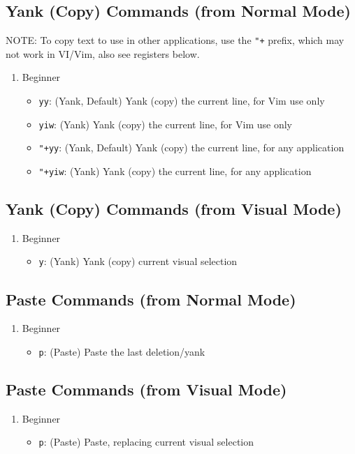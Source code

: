 \documentclass[11pt]{article}
\begin{document}
\subsection{Yank (Copy) Commands (from Normal Mode)}
\label{sec:org9ae1422}
NOTE: To copy text to use in other applications, use the \texttt{"+} prefix, which may
not work in VI/Vim, also see registers below. 
\begin{enumerate}
\item Beginner
\label{sec:org7fb8d96}
\begin{itemize}
\item \texttt{yy}: (Yank, Default) Yank (copy) the current line, for Vim use only
\item \texttt{yiw}: (Yank) Yank (copy) the current line, for Vim use only
\item \texttt{"+yy}: (Yank, Default) Yank (copy) the current line, for any application
\item \texttt{"+yiw}: (Yank) Yank (copy) the current line, for any application
\end{itemize}
\end{enumerate}
\subsection{Yank (Copy) Commands (from Visual Mode)}
\label{sec:orga564125}
\begin{enumerate}
\item Beginner
\label{sec:orgbc5235c}
\begin{itemize}
\item \texttt{y}: (Yank) Yank (copy) current visual selection
\end{itemize}
\end{enumerate}
\subsection{Paste Commands (from Normal Mode)}
\label{sec:org9f45b44}
\begin{enumerate}
\item Beginner
\label{sec:org5f86a11}
\begin{itemize}
\item \texttt{p}: (Paste) Paste the last deletion/yank
\end{itemize}
\end{enumerate}
\subsection{Paste Commands (from Visual Mode)}
\label{sec:orgffb4d8c}
\begin{enumerate}
\item Beginner
\label{sec:orgf25f22d}
\begin{itemize}
\item \texttt{p}: (Paste) Paste, replacing current visual selection
\end{itemize}
\end{enumerate}
\end{document}
